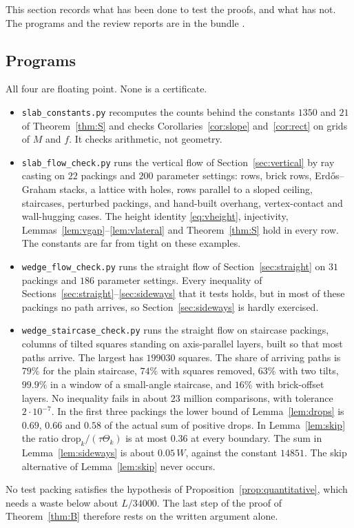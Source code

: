 \label{sec:checks}
This section records what has been done to test the proofs, and what has not. The programs and the review reports are in the bundle \cite{Fan26c}.

\subsection*{Programs}
All four are floating point. None is a certificate.
\begin{itemize}
\item \texttt{slab\_constants.py} recomputes the counts behind the constants $1350$ and $21$ of Theorem~\ref{thm:S} and checks Corollaries~\ref{cor:slope} and~\ref{cor:rect} on grids of $M$ and $f$. It checks arithmetic, not geometry.
\item \texttt{slab\_flow\_check.py} runs the vertical flow of Section~\ref{sec:vertical} by ray casting on $22$ packings and $200$ parameter settings: rows, brick rows, Erd\H{o}s--Graham stacks, a lattice with holes, rows parallel to a sloped ceiling, staircases, perturbed packings, and hand-built overhang, vertex-contact and wall-hugging cases. The height identity \eqref{eq:vheight}, injectivity, Lemmas~\ref{lem:vgap}--\ref{lem:vlateral} and Theorem~\ref{thm:S} hold in every row. The constants are far from tight on these examples.
\item \texttt{wedge\_flow\_check.py} runs the straight flow of Section~\ref{sec:straight} on $31$ packings and $186$ parameter settings. Every inequality of Sections~\ref{sec:straight}--\ref{sec:sideways} that it tests holds, but in most of these packings no path arrives, so Section~\ref{sec:sideways} is hardly exercised.
\item \texttt{wedge\_staircase\_check.py} runs the straight flow on staircase packings, columns of tilted squares standing on axis-parallel layers, built so that most paths arrive. The largest has $199030$ squares. The share of arriving paths is $79\%$ for the plain staircase, $74\%$ with squares removed, $63\%$ with two tilts, $99.9\%$ in a window of a small-angle staircase, and $16\%$ with brick-offset layers. No inequality fails in about $23$ million comparisons, with tolerance $2\cdot10^{-7}$. In the first three packings the lower bound of Lemma~\ref{lem:drops} is $0.69$, $0.66$ and $0.58$ of the actual sum of positive drops. In Lemma~\ref{lem:skip} the ratio $\mathrm{drop}_k/(\tau\Theta_k)$ is at most $0.36$ at every boundary. The sum in Lemma~\ref{lem:sideways} is about $0.05\,W$, against the constant $14851$. The skip alternative of Lemma~\ref{lem:skip} never occurs.
\end{itemize}
No test packing satisfies the hypothesis of Proposition~\ref{prop:quantitative}, which needs a waste below about $L/34000$. The last step of the proof of Theorem~\ref{thm:B} therefore rests on the written argument alone.

